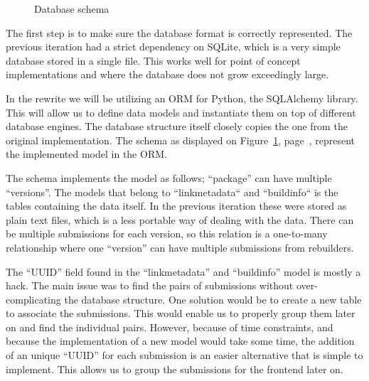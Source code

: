 \documentclass[../Main/thesis.tex]{subfiles}
\begin{document}
\begin{figure}[H]
\caption{Database schema}
\label{fig:schema}
\end{figure}

The first step is to make sure the database format is correctly represented. The
previous iteration had a strict dependency on SQLite, which is a very simple
database stored in a single file. This works well for point of concept
implementations and where the database does not grow exceedingly large.

In the rewrite we will be utilizing an ORM for Python, the SQLAlchemy library.
This will allow us to define data models and instantiate them on top of
different database engines. The database structure itself closely copies the one
from the original implementation. The schema as displayed on
Figure~\ref{fig:schema}, page~\pageref{fig:schema}, represent the implemented
model in the ORM.

The schema implements the model as follows; ``package'' can have multiple
``versions''. The models that belong to ``linkmetadata`` and ``buildinfo`` is
the tables containing the data itself. In the previous iteration these were
stored as plain text files, which is a less portable way of dealing with the
data. There can be multiple submissions for each version, so this relation is a
one-to-many relationship where one ``version'' can have multiple submissions
from rebuilders.

The ``UUID'' field found in the ``linkmetadata'' and ``buildinfo'' model is
mostly a hack. The main issue was to find the pairs of submissions without
over-complicating the database structure. One solution would be to create a new
table to associate the submissions. This would enable us to properly group them
later on and find the individual pairs. However, because of time constraints,
and because the implementation of a new model would take some time, the addition
of an unique ``UUID'' for each submission is an easier alternative that is
simple to implement. This allows us to group the submissions for the frontend
later on.
\end{document}
